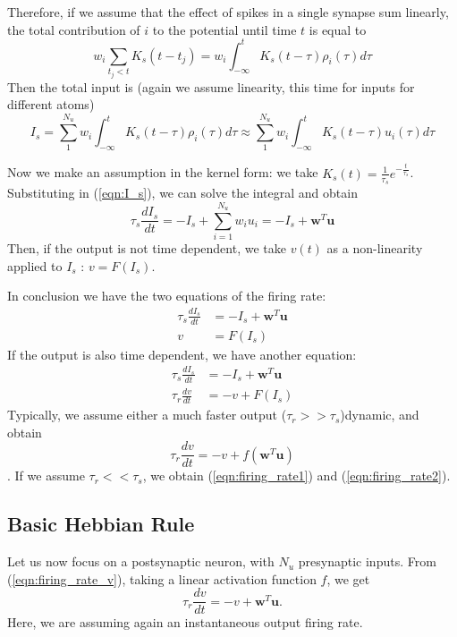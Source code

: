 \documentclass[oneside]{book}
\renewcommand{\u}{\mathbf{u}}
\newcommand{\w}{\mathbf{w}}
\theoremstyle{definition}
\theoremstyle{plain}
\begin{document}
Therefore, if we assume that the effect of spikes in a single synapse sum linearly,  the total contribution of $i$ to the potential until time $t$ is equal to
\begin{equation} 
    w_i \sum_{t_j< t} K_{s}(t-t_j) =w_i \int_{-\infty}^{t} K_s(t-\tau) \rho_i(\tau) d\tau 
\end{equation}
Then the total input is (again we assume linearity, this time for inputs for different atoms)
\begin{equation}
\label{eqn:I_s}
    I_s=\sum_{1}^{N_u} w_i \int_{-\infty}^{t} K_s(t-\tau) \rho_i(\tau) d\tau \approx
    \sum_{1}^{N_u} w_i \int_{-\infty}^{t} K_s(t-\tau) u_i(\tau) d\tau
\end{equation}

Now we make an assumption in the kernel form: we take $K_s(t)= \frac{1}{\tau_s} e^{-\frac{t}{\tau_s}}$. Substituting in (\ref{eqn:I_s}), we can solve the integral and obtain
\begin{equation*}
    \tau_s \frac{dI_s}{dt} = -I_s +\sum_{i=1}^{N_u} w_iu_i =-I_s + \w^T \u
\end{equation*}
Then, if the output is not time dependent, we take $v(t)$ as a non-linearity applied to $I_s$ : $v=F(I_s)$. 

In conclusion we have the two equations of the firing rate:
\begin{align}
\label{eqn:firing_rate1}
    \tau_s \frac{dI_s}{dt} &=-I_s +\w^T \u\\
    \label{eqn:firing_rate2}
    v&=F(I_s)
\end{align}
If the output is also time dependent, we have another equation:
\begin{align}
    \tau_s \frac{dI_s}{dt} &=-I_s +\w^T\u\\
    \tau_r \frac{dv}{dt}&=-v + F(I_s)
\end{align}
Typically, we assume either a much faster output ($\tau_r>> \tau_s$)dynamic, and obtain
\begin{equation}
\label{eqn:firing_rate_v}
    \tau_r \frac{dv}{dt} = -v + f(\w^T\u)
\end{equation}.
If we assume $\tau_r<<\tau_s$, we obtain (\ref{eqn:firing_rate1}) and (\ref{eqn:firing_rate2}). 
\subsection{Basic Hebbian Rule}
Let us now focus on a postsynaptic neuron, with $N_u$ presynaptic inputs.
From (\ref{eqn:firing_rate_v}), taking a linear activation function $f$, we get 
\[
    \tau_r \frac{dv}{dt} = -v + \w^T\u.
\]
Here, we are assuming again an instantaneous output firing rate.
\end{document}
